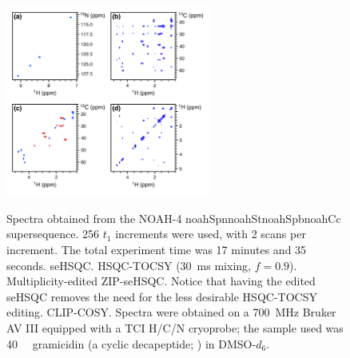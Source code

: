 \documentclass[11pt]{article}
\newcommand*{\noahfour}[4]{\csname noah#1\endcsname\csname noah#2\endcsname\csname noah#3\endcsname\csname noah#4\endcsname}
\newcommand*{\carbon}{\ce{^{13}C}}
\newcommand*{\nitrogen}{\ce{^{15}N}}
\begin{document}


\begin{figure}
    \centering
    \includegraphics[width=0.6\textwidth]{spnstspcc.png}
    {\label{fig:spnstspcc_spn}}
    {\label{fig:spnstspcc_st}}
    {\label{fig:spnstspcc_sp}}
    {\label{fig:spnstspcc_cc}}
    \caption{
        Spectra obtained from the NOAH-4 \noahfour{Spn}{St}{Spb}{Cc} supersequence.
        256 $t_1$ increments were used, with 2 scans per increment.
        The total experiment time was 17 minutes and 35 seconds.
        \textbf{} \nitrogen{} seHSQC.
        \textbf{} \carbon{} HSQC-TOCSY (\SI{30}{ms} mixing, $f = 0.9$).
        \textbf{} Multiplicity-edited \carbon{} ZIP-seHSQC. Notice that having the edited seHSQC removes the need for the less desirable HSQC-TOCSY editing.
        \textbf{} CLIP-COSY.
        Spectra were obtained on a \SI{700}{\MHz} Bruker AV III equipped with a TCI H/C/N cryoprobe; the sample used was \SI{40}{\milli\molar} gramicidin (a cyclic decapeptide; ) in DMSO-$d_6$.
    }
    \label{fig:spnstspcc}
\end{figure}
\end{document}
